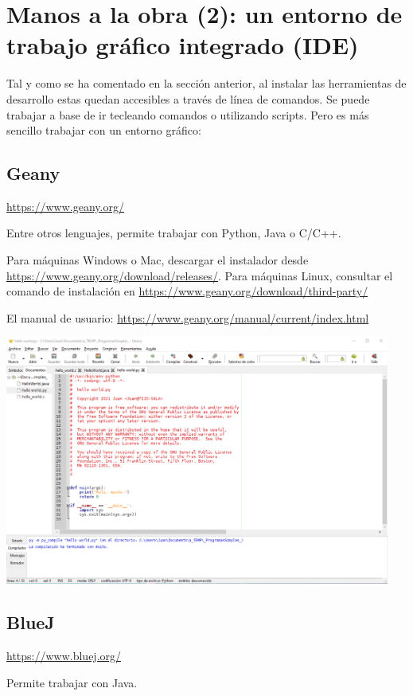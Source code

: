 \documentclass[spanish,12pt,a4paper,final,oneside]{book}
\begin{document}
\section{Manos a la obra (2): un entorno de trabajo gráfico integrado (IDE)}\label{manos_a_la_obra_2}

Tal y como se ha comentado en la sección anterior, al instalar las herramientas de desarrollo estas quedan accesibles a través de línea de comandos. Se puede trabajar a base de ir tecleando comandos o utilizando scripts. Pero es más sencillo trabajar con un entorno gráfico:

\subsection{Geany}

\url{https://www.geany.org/}

Entre otros lenguajes, permite trabajar con Python, Java o C/C++.

Para máquinas Windows o Mac, descargar el instalador desde \url{https://www.geany.org/download/releases/}. Para máquinas Linux, consultar el comando de instalación en \url{https://www.geany.org/download/third-party/}

El manual de usuario: \url{https://www.geany.org/manual/current/index.html}

\includegraphics[width=0.95\textwidth]{pantallazo de Geany.png}


\subsection{BlueJ}

\url{https://www.bluej.org/}

Permite trabajar con Java. 
\end{document}
